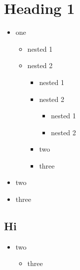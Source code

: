 \documentclass{article}
\begin{document}
 
\setcounter{secnumdepth}{0}

    
\section{Heading 1}
\begin{itemize}
    \item one
\begin{itemize}
    \item nested 1
    \item nested 2
\begin{itemize}
    \item nested 1
    \item nested 2
\begin{itemize}
    \item nested 1
    \item nested 2
\end{itemize}

    \item two
    \item three
\end{itemize}

\end{itemize}

\end{itemize}

\begin{itemize}
    \item two
    \item three
\end{itemize}

\subsection{Hi}
\begin{itemize}
    \item two
\begin{itemize}
    \item three
\end{itemize}

\end{itemize}
\end{document}
